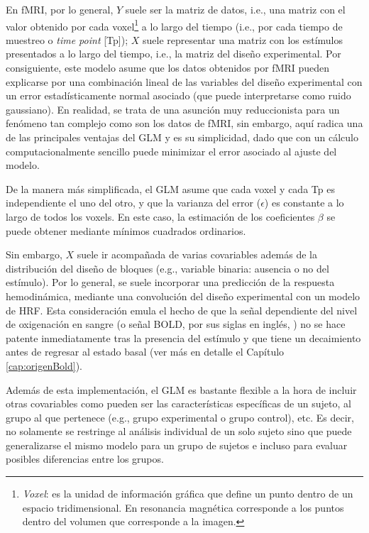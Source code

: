 En fMRI, por lo general, $Y$ suele ser la matriz de datos, i.e., una matriz con el valor obtenido por cada voxel\footnote{\textit{Voxel}: es la unidad de información gráfica que define un punto dentro de un espacio tridimensional. En resonancia magnética corresponde a los puntos dentro del volumen que corresponde a la imagen.} a lo largo del tiempo (i.e., por cada tiempo de muestreo o \textit{time point} [Tp]); $X$ suele representar una matriz con los estímulos presentados a lo largo del tiempo, i.e., la matriz del diseño experimental. Por consiguiente, este modelo asume que los datos obtenidos por fMRI pueden explicarse por una combinación lineal de las variables del diseño experimental con un error estadísticamente normal asociado (que puede interpretarse como ruido gaussiano). En realidad, se trata de una asunción muy reduccionista para un fenómeno tan complejo como son los datos de fMRI, sin embargo, aquí radica una de las principales ventajas del GLM y es su simplicidad, dado que con un cálculo computacionalmente sencillo puede minimizar el error asociado al ajuste del modelo.

De la manera más simplificada, el GLM asume que cada voxel y cada Tp es independiente el uno del otro, y que la varianza del error ($\epsilon$) es constante a lo largo de todos los voxels. En este caso, la estimación de los coeficientes $\beta$ se puede obtener mediante mínimos cuadrados ordinarios.

Sin embargo, $X$ suele ir acompañada de varias covariables además de la distribución del diseño de bloques (e.g., variable binaria: ausencia o no del estímulo). Por lo general, se suele incorporar una predicción de la respuesta hemodinámica, mediante una convolución del diseño experimental con un modelo de HRF. Esta consideración emula el hecho de que la señal dependiente del nivel de oxigenación en sangre (o señal BOLD, por sus siglas en inglés, \cite{OgawaS1990}) no se hace patente inmediatamente tras la presencia del estímulo y que tiene un decaimiento antes de regresar al estado basal (ver más en detalle el Capítulo \ref{cap:origenBold}).

Además de esta implementación, el GLM es bastante flexible a la hora de incluir otras covariables como pueden ser las características específicas de un sujeto, al grupo al que pertenece (e.g., grupo experimental o grupo control), etc. Es decir, no solamente se restringe al análisis individual de un solo sujeto sino que puede generalizarse el mismo modelo para un grupo de sujetos e incluso para evaluar posibles diferencias entre los grupos.


